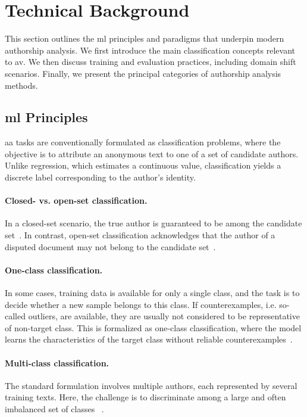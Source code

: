 \section{Technical Background}

This section outlines the \ac{ml} principles and paradigms that underpin modern authorship analysis. 
We first introduce the main classification concepts relevant to \ac{av}. 
We then discuss training and evaluation practices, including domain shift scenarios. 
Finally, we present the principal categories of authorship analysis methods.

\subsection{\acl{ml} Principles}

\ac{aa} tasks are conventionally formulated as classification problems, where the objective is to attribute an anonymous text to one of a set of candidate authors. 
Unlike regression, which estimates a continuous value, classification yields a discrete label corresponding to the author’s identity.

\paragraph{Closed- vs. open-set classification.} 
In a closed-set scenario, the true author is guaranteed to be among the candidate set~\citep{stamatatos_survey_2009,koppel_authorship_2011,barlas_cross_domain_2020,boenninghoff_o2d2_2021,neal_surveying_2018}. 
In contrast, open-set classification acknowledges that the author of a disputed document may not belong to the candidate set~\citep{stamatatos_survey_2009,barlas_cross_domain_2020,neal_surveying_2018}. 

\paragraph{One-class classification.} 
In some cases, training data is available for only a single class, and the task is to decide whether a new sample belongs to this class.
If counterexamples, i.e. so-called outliers, are available, they are usually not considered to be representative of non-target class. 
This is formalized as one-class classification, where the model learns the characteristics of the target class without reliable counterexamples~\citep{stein_intrinsic_2011,koppel_authorship_2004}.

\paragraph{Multi-class classification.} 
The standard formulation involves multiple authors, each represented by several training texts. 
Here, the challenge is to discriminate among a large and often imbalanced set of classes~\citep{stamatatos_survey_2009,koppel_authorship_2004,elmanarelbouanani_authorship_2014} .


